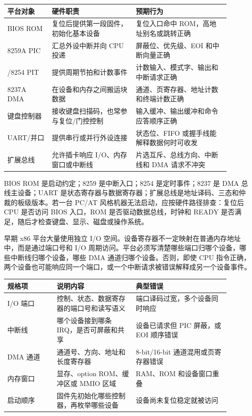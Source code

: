 \begin{longtable}{L{0.18\linewidth}L{0.34\linewidth}L{0.38\linewidth}}
\toprule
平台对象 & 硬件职责 & 预期行为 \\
\midrule
BIOS ROM & 复位后提供第一段固件，初始化基本设备 & 复位入口命中 ROM，高地址别名或跳转正确 \\\tablerowrule
8259A PIC & 汇总外设中断并向 CPU 投递 & 屏蔽位、优先级、EOI 和中断向量正确 \\/8254 PIT & 提供周期节拍和计数事件 & 计数输入、模式字、输出和中断请求正确 \\\tablerowrule
8237A DMA & 在设备和内存之间搬运块数据 & 通道、页寄存器、地址计数和终端计数正确 \\\tablerowrule
键盘控制器 & 接收键盘扫描码，也常参与复位/门控控制 & 输入缓冲、输出缓冲和命令应答顺序正确 \\\tablerowrule
UART/并口 & 提供串行或并行外设连接 & 状态位、FIFO 或握手线能解释数据何时可收发 \\\tablerowrule
扩展总线 & 允许插卡响应 I/O、内存窗口或中断线 & 片选互斥、总线方向、中断线和 DMA 请求不冲突 \\
\bottomrule
\end{longtable}

BIOS ROM 是启动约定；8259 是中断入口；8254 是定时事件；8237 是 DMA 总线主设备；UART 是状态寄存器与数据寄存器；扩展总线是地址译码、三态和仲裁的板级版本。若一台 PC/AT 风格机器无法启动，应按硬件路径排查：复位后 CPU 是否访问 BIOS 入口，ROM 是否驱动数据总线，时钟和 READY 是否满足，随后才检查键盘、显示、磁盘或操作系统。

早期 x86 平台大量使用独立 I/O 空间。设备寄存器不一定映射在普通内存地址中，而是通过端口号和 I/O 周期访问。平台必须写清楚哪些端口归哪个设备，哪些中断线归哪个设备，哪些 DMA 通道归哪个设备。否则，即使 CPU 指令正确，两个设备也可能响应同一个端口，或一个中断请求被错误解释成另一个设备事件。

\begin{longtable}{L{0.2\linewidth}L{0.32\linewidth}L{0.38\linewidth}}
\toprule
规格项 & 说明内容 & 典型错误 \\
\midrule
I/O 端口 & 控制、状态、数据寄存器的端口号和读写语义 & 端口译码过宽，多个设备同时响应 \\\tablerowrule
中断线 & 哪个设备接到哪条 IRQ，是否可屏蔽和共享 & 设备已请求但 PIC 屏蔽，或 EOI 顺序错误 \\\tablerowrule
DMA 通道 & 通道号、方向、地址和长度寄存器 & 8-bit/16-bit 通道混用或页寄存器错误 \\\tablerowrule
内存窗口 & 显存、option ROM、缓冲区或 MMIO 区域 & RAM、ROM 和设备窗口重叠 \\\tablerowrule
启动顺序 & 固件先初始化哪些控制器，再枚举哪些设备 & 设备尚未复位稳定就被访问 \\
\bottomrule
\end{longtable}

